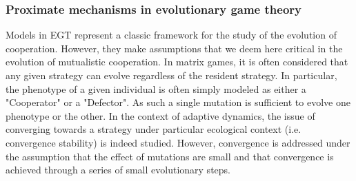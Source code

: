 
        \subsubsection{Proximate mechanisms in evolutionary game theory}

            Models in EGT represent a classic framework for the study of the evolution of cooperation. However, they make assumptions that we deem here critical in the evolution of mutualistic cooperation. In matrix games, it is often considered that any given strategy can evolve regardless of the resident strategy. In particular, the phenotype of a given individual is often simply modeled as either a "Cooperator" or a "Defector". As such a single mutation is sufficient to evolve one phenotype or the other. In the context of adaptive dynamics, the issue of converging towards a strategy under particular ecological context (i.e. convergence stability) is indeed studied. However, convergence is addressed under the assumption that the effect of mutations are small and that convergence is achieved through a series of small evolutionary steps.

